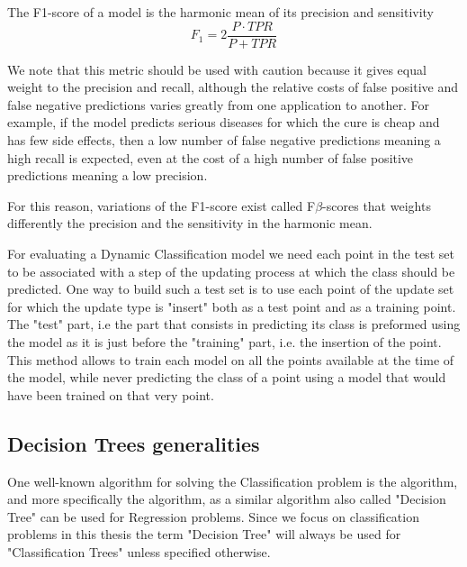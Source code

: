 \begin{definition}[F1-score]
    The F1-score of a model is the harmonic mean of its precision and sensitivity
    \begin{equation}
        F_1 = 2\frac{P \cdot TPR}{P + TPR}
    \end{equation}
\end{definition}

We note that this metric should be used with caution because it gives equal weight to the precision and recall, although the relative costs of false positive and false negative predictions varies greatly from one application to another. For example, if the model predicts serious diseases for which the cure is cheap and has few side effects, then a low number of false negative predictions meaning a high recall is expected, even at the cost of a high number of false positive predictions meaning a low precision.

For this reason, variations of the F1-score exist called F$\beta$-scores that weights differently the precision and the sensitivity in the harmonic mean.

For evaluating a Dynamic Classification model we need each point in the test set to be associated with a step of the updating process at which the class should be predicted. One way to build such a test set is to use each point of the update set for which the update type is "insert" both as a test point and as a training point. The "test" part, i.e the part that consists in predicting its class is preformed using the model as it is just before the "training" part, i.e. the insertion of the point. This method allows to train each model on all the points available at the time of the model, while never predicting the class of a point using a model that would have been trained on that very point.

\subsection{Decision Trees generalities}
One well-known algorithm for solving the Classification problem is the  algorithm, and more specifically the  algorithm, as a similar algorithm also called "Decision Tree" can be used for Regression problems. Since we focus on classification problems in this thesis the term "Decision Tree" will always be used for "Classification Trees" unless specified otherwise.

